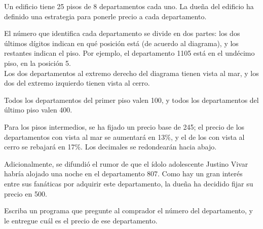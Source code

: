 Un edificio tiene 25 pisos de 8 departamentos cada uno.
La dueña del edificio ha definido una estrategia
para ponerle precio a cada departamento.

\begin{minipage}[T]{.71\textwidth}
  El número que identifica cada departamento se divide en dos partes:
  los dos últimos dígitos indican en qué posición está
  (de acuerdo al diagrama),
  y los restantes indican el piso.
  Por ejemplo, el departamento 1105 está en el undécimo piso,
  en la posición 5.
  \\[.6ex]
  Los dos departamentos al extremo derecho del diagrama
  tienen vista al mar,
  y los dos del extremo izquierdo
  tienen vista al cerro.
\end{minipage}
\hspace{1em}
\begin{minipage}[T]{.25\textwidth}
\end{minipage}

Todos los departamentos del primer piso valen 100,
y todos los departamentos del último piso valen 400.

Para los pisos intermedios,
se ha fijado un precio base de 245;
el precio de los departamentos con vista al mar se aumentará en 13\%,
y el de los con vista al cerro se rebajará en 17\%.
Los decimales se redondearán hacia abajo.

Adicionalmente,
se difundió el rumor de que el ídolo adolescente Justino Vivar
habría alojado una noche en el departamento 807.
Como hay un gran interés entre sus fanáticas
por adquirir este departamento,
la dueña ha decidido fijar su precio en 500.

Escriba un programa que pregunte al comprador el número del departamento,
y le entregue cuál es el precio de ese departamento.

